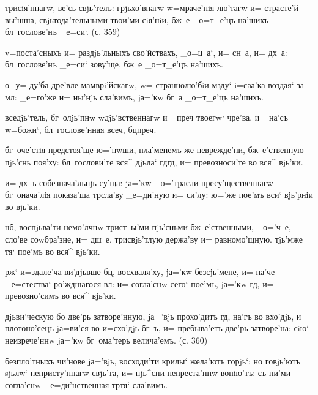 трисiя'ннагw, ве'сь свjь'телъ: грjьхо'внагw w=мраче'нiя 
лю'тагw и= страсте'й вы'шша, свjьтода'тельными твои'ми 
сiя'нiи, бж~е _о=т_е'цъ на'шихъ бл~гослове'нъ _е=си`. (с. 
359)

v=поста'сныхъ и= раздjь'льныхъ сво'йствахъ, _о=ц~а`, и= 
сн~а, и= дх~а: бл~гослове'нъ _е=си` зову'ще, бж~е 
_о=т_е'цъ на'шихъ.

о_у= ду'ба дре'вле мамврi'йскагw, w= страннолю'бiи мзду` 
i=саа'ка воздая` за мл: _е=го'же и= ны'нjь сла'вимъ, 
jа='кw бг~а _о=т_е'цъ на'шихъ.

вседjь'тель, бг~олjь'пнw w\т дjь'вственнагw и= преч 
твоегw` чре'ва, и= на'съ w=божи`, бл~гослове'нная 
всеч, бц преч.


бг~оче'стiя предстоя'ще ю='нwши, пла'менемъ же 
неврежде'ни, бж~е'ственную пjь'снь поя'ху: бл~гослови'те 
вся^ дjьла` гд гд, и= превозноси'те во вся^ 
вjь'ки.

и= дх~ъ собезнача'льнjь су'ща: jа='кw _о='трасли 
пресу'щественнагw бг~онача'лiя показа'ша тр сла'ву 
_е=ди'ную и= си'лу: ю='же пое'мъ вси` вjь'рнiи во вjь'ки. 

нб, воспjьва'ти немо'лчнw трист~ы'ми пjь'сньми 
бж~е'ственными, _о='ч~е, сло'ве соwбра'зне, и= дш~е, 
трисвjь'тлую держа'ву и= равномо'щную. тjь'мже тя` пое'мъ 
во вся^ вjь'ки.

рж` и=здале'ча ви'дjьвше бц, восхваля'ху, jа='кw 
без\ъ сjь'мене, и= па'че _е=стества` ро'ждшагося вл: 
и= согла'снw сего` пое'мъ, jа='кw гд, и= превозно'симъ 
во вся^ вjь'ки.


дjьви'ческую бо две'рь затворе'нную, jа='вjь прохо'дитъ 
гд, на'гъ во вхо'дjь, и= плотоно'сецъ jа=ви'ся во 
и=схо'дjь бг~ъ, и= пребыва'етъ две'рь затворе'на: сiю` 
неизрече'ннw jа='кw бг~ома'терь велича'емъ. (с. 360)

безпло'тныхъ чи'нове jа='вjь, восходи'ти крилы` жела'ютъ 
горjь`: но говjь'ютъ sjьлw` непристу'пнагw свjь'та, и= 
пjь^сни непреста'ннw вопiю'тъ: съ ни'ми согла'снw 
_е=ди'нственная тр тя` сла'вимъ. %

